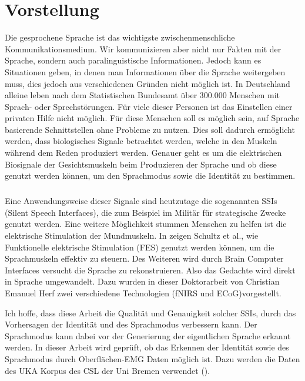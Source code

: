 \chapter{Vorstellung}
Die gesprochene Sprache ist das wichtigste zwischenmenschliche Kommunikationsmedium. Wir kommunizieren aber nicht nur Fakten mit der Sprache, sondern auch paralinguistische Informationen.
Jedoch kann es Situationen geben, in denen man Informationen über die Sprache weitergeben muss, dies jedoch aus verschiedenen Gründen nicht möglich ist. In Deutschland alleine leben nach dem Statistischen Bundesamt \cite{StatBund} über 300.000 Menschen mit Sprach- oder Sprechstörungen. Für viele dieser Personen ist das Einstellen einer privaten Hilfe nicht möglich. Für diese Menschen soll es möglich sein, auf Sprache basierende Schnittstellen ohne Probleme zu nutzen. Dies soll dadurch ermöglicht werden, dass biologisches Signale betrachtet werden, welche in den Muskeln während dem Reden produziert werden. Genauer geht es um die elektrischen Biosignale der Gesichtsmuskeln beim Produzieren der Sprache und ob diese genutzt werden können, um den Sprachmodus sowie die Identität zu bestimmen.


\paragraph{}
Eine Anwendungsweise dieser Signale sind heutzutage die sogenannten SSIs (Silent Speech Interfaces), die zum Beispiel im Militär \cite{6415781} für strategische Zwecke genutzt werden. Eine weitere Möglichkeit stummen Menschen zu helfen ist die elektrische Stimulation der Mundmuskeln. In \cite{schultz_embc_2019} zeigen Schultz et al., wie Funktionelle elektrische Stimulation (FES) genutzt werden können, um die Sprachmuskeln effektiv zu steuern.
Des Weiteren wird durch Brain Computer Interfaces versucht die Sprache zu rekonstruieren. Also das Gedachte wird direkt in Sprache umgewandelt. Dazu wurden in dieser Doktorarbeit von Christian Emanuel Herf zwei verschiedene Technologien (fNIRS und ECoG)vorgestellt. \cite{herff2016speech} 

Ich hoffe, dass diese Arbeit die Qualität und Genauigkeit solcher SSIs, durch das Vorhersagen der Identität und des Sprachmodus verbessern kann. Der Sprachmodus kann dabei vor der Generierung der eigentlichen Sprache erkannt werden\cite{Tanja_Interspeechkeynote_2019}.
In dieser Arbeit wird geprüft, ob das Erkennen der Identität sowie des Sprachmodus durch Oberflächen-EMG Daten möglich ist. Dazu werden die Daten des UKA Korpus des CSL der Uni Bremen verwendet (\cite{WaJaSch2014-IS}).


